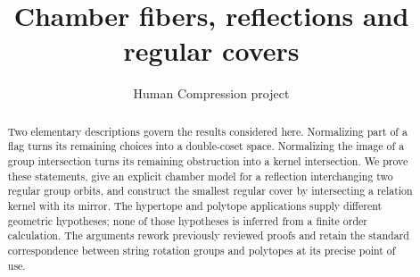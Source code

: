 
\title{Chamber fibers, reflections and regular covers}
\author{Human Compression project}
\maketitle
\begin{abstract}
Two elementary descriptions govern the results considered here. Normalizing part of a flag turns its remaining choices into a double-coset space. Normalizing the image of a group intersection turns its remaining obstruction into a kernel intersection. We prove these statements, give an explicit chamber model for a reflection interchanging two regular group orbits, and construct the smallest regular cover by intersecting a relation kernel with its mirror. The hypertope and polytope applications supply different geometric hypotheses; none of those hypotheses is inferred from a finite order calculation. The arguments rework previously reviewed proofs and retain the standard correspondence between string rotation groups and polytopes at its precise point of use.
\end{abstract}





